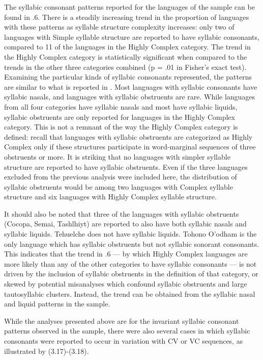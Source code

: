   The syllabic consonant patterns reported for the languages of the sample can be found in .6. There is a steadily increasing trend in the proportion of languages with these patterns as syllable structure complexity increases: only two of languages with Simple syllable structure are reported to have syllabic consonants, compared to 11 of the languages in the Highly Complex category. The trend in the Highly Complex category is statistically significant when compared to the trends in the other three categories combined (p = .01 in Fisher’s exact test). Examining the particular kinds of syllabic consonants represented, the patterns are similar to what is reported in \citet{Bell1978a}. Most languages with syllabic consonants have syllabic nasals, and languages with syllabic obstruents are rare. While languages from all four categories have syllabic nasals and most have syllabic liquids, syllabic obstruents are only reported for languages in the Highly Complex category. This is not a remnant of the way the Highly Complex category is defined: recall that languages with syllabic obstruents are categorized as Highly Complex only if these structures participate in word-marginal sequences of three obstruents or more. It is striking that no languages with simpler syllable structure are reported to have syllabic obstruents. Even if the three languages excluded from the previous analysis were included here, the distribution of syllabic obstruents would be among two languages with Complex syllable structure and six languages with Highly Complex syllable structure. 



  It should also be noted that three of the languages with syllabic obstruents (Cocopa, Semai, Tashlhiyt) are reported to also have both syllabic nasals and syllabic liquids. Tehuelche does not have syllabic liquids. Tohono O’odham is the only language which has syllabic obstruents but not syllabic sonorant consonants. This indicates that the trend in .6 — by which Highly Complex languages are more likely than any of the other categories to have syllabic consonants  — is not driven by the inclusion of syllabic obstruents in the definition of that category, or skewed by potential misanalyses which confound syllabic obstruents and large tautosyllabic clusters. Instead, the trend can be obtained from the syllabic nasal and liquid patterns in the sample.



  While the analyses presented above are for the invariant syllabic consonant patterns observed in the sample, there were also several cases in which syllabic consonants were reported to occur in variation with CV or VC sequences, as illustrated by (3.17)-(3.18).



